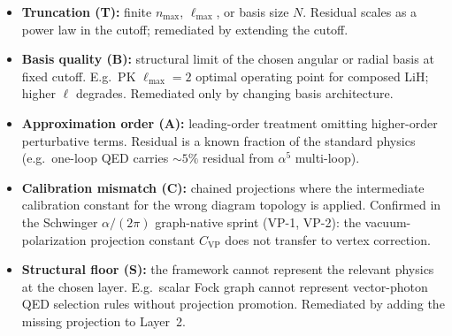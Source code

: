 \documentclass[11pt]{article}
\begin{document}
\begin{itemize}
\setlength\itemsep{0pt}
\item \textbf{Truncation (T):} finite $n_\text{max}$, $\ell_\text{max}$,
or basis size $N$.  Residual scales as a power law in the cutoff;
remediated by extending the cutoff.
\item \textbf{Basis quality (B):} structural limit of the chosen
angular or radial basis at fixed cutoff.  E.g.\ PK $\ell_\text{max}=2$
optimal operating point for composed LiH; higher $\ell$ degrades.
Remediated only by changing basis architecture.
\item \textbf{Approximation order (A):} leading-order treatment
omitting higher-order perturbative terms.  Residual is a known
fraction of the standard physics (e.g.\ one-loop QED carries
$\sim 5\%$ residual from $\alpha^5$ multi-loop).
\item \textbf{Calibration mismatch (C):} chained projections where
the intermediate calibration constant for the wrong diagram
topology is applied.  Confirmed in the Schwinger $\alpha/(2\pi)$
graph-native sprint (VP-1, VP-2): the vacuum-polarization projection
constant $C_{\text{VP}}$ does not transfer to vertex correction.
\item \textbf{Structural floor (S):} the framework cannot represent
the relevant physics at the chosen layer.  E.g.\ scalar Fock graph
cannot represent vector-photon QED selection rules without
projection promotion.  Remediated by adding the missing projection
to Layer~2.
\end{itemize}
\end{document}
